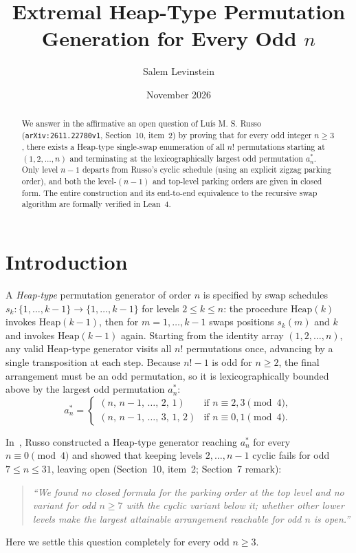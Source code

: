 \documentclass[11pt]{article}
\title{Extremal Heap-Type Permutation Generation for Every Odd $n$}
\author{Salem Levinstein}
\date{November 2026}
\begin{document}
\maketitle

\begin{abstract}
We answer in the affirmative an open question of Lu\'is M. S. Russo
(\texttt{arXiv:2611.22780v1}, Section~10, item~2) by proving that for every
odd integer $n \ge 3$, there exists a Heap-type single-swap enumeration of all
$n!$ permutations starting at $(1,2,\dots,n)$ and terminating at the
lexicographically largest odd permutation $a^*_n$. Only level $n-1$ departs
from Russo's cyclic schedule (using an explicit zigzag parking order), and both
the level-$(n-1)$ and top-level parking orders are given in closed form. The
entire construction and its end-to-end equivalence to the recursive swap
algorithm are formally verified in Lean~4.
\end{abstract}

\section{Introduction}

A \emph{Heap-type} permutation generator of order $n$ is specified by swap
schedules $s_k : \{1,\dots,k-1\} \to \{1,\dots,k-1\}$ for levels $2 \le k \le n$:
the procedure $\mathrm{Heap}(k)$ invokes $\mathrm{Heap}(k-1)$, then for
$m = 1,\dots,k-1$ swaps positions $s_k(m)$ and $k$ and invokes $\mathrm{Heap}(k-1)$
again. Starting from the identity array $(1,2,\dots,n)$, any valid Heap-type
generator visits all $n!$ permutations once, advancing by a single transposition
at each step. Because $n! - 1$ is odd for $n \ge 2$, the final arrangement must
be an odd permutation, so it is lexicographically bounded above by the largest
odd permutation $a^*_n$:
\[
a^*_n = \begin{cases}
(n,\, n-1,\, \dots,\, 2,\, 1) & \text{if } n \equiv 2,3 \pmod 4, \\
(n,\, n-1,\, \dots,\, 3,\, 1,\, 2) & \text{if } n \equiv 0,1 \pmod 4.
\end{cases}
\]

In~\cite{Russo2026}, Russo constructed a Heap-type generator reaching $a^*_n$ for
every $n \equiv 0 \pmod 4$ and showed that keeping levels $2,\dots,n-1$ cyclic
fails for odd $7 \le n \le 31$, leaving open (Section~10, item~2; Section~7
remark):
\begin{quote}
\emph{``We found no closed formula for the parking order at the top level and no
variant for odd $n \ge 7$ with the cyclic variant below it; whether other lower
levels make the largest attainable arrangement reachable for odd $n$ is open.''}
\end{quote}
Here we settle this question completely for every odd $n \ge 3$.
\end{document}
